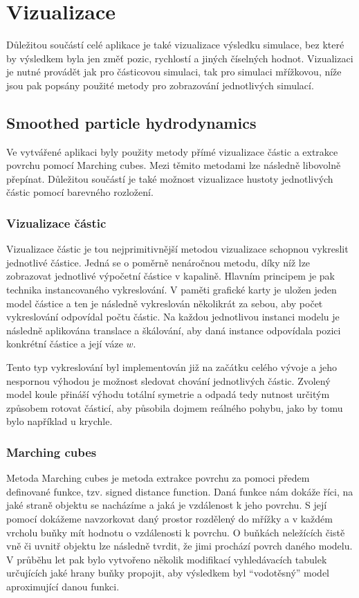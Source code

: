 \section{Vizualizace}
\label{chapter:Vizualizace}
Důležitou součástí celé aplikace je také vizualizace výsledku simulace, bez které by výsledkem byla jen změť pozic, rychlostí a jiných číselných hodnot. Vizualizaci je nutné provádět jak pro částicovou simulaci, tak pro simulaci mřížkovou, níže jsou pak popsány použité metody pro zobrazování jednotlivých simulací.

\subsection{Smoothed particle hydrodynamics}
\label{chapter:vizSPH}
Ve vytvářené aplikaci byly použity metody přímé vizualizace částic a extrakce povrchu pomocí Marching cubes. Mezi těmito metodami lze následně libovolně přepínat. Důležitou součástí je také možnost vizualizace hustoty jednotlivých částic pomocí barevného rozložení.

\subsubsection{Vizualizace částic}
Vizualizace částic je tou nejprimitivnější metodou vizualizace schopnou vykreslit jednotlivé částice. Jedná se o poměrně nenáročnou metodu, díky níž lze zobrazovat jednotlivé výpočetní částice v kapalině. Hlavním principem je pak technika instancovaného vykreslování. V paměti grafické karty je uložen jeden model částice a ten je následně vykreslován několikrát za sebou, aby počet vykreslování odpovídal počtu částic. Na každou jednotlivou instanci modelu je následně aplikována translace a škálování, aby daná instance odpovídala pozici konkrétní částice a její váze $w$.

Tento typ vykreslování byl implementován již na začátku celého vývoje a jeho nespornou výhodou je možnost sledovat chování jednotlivých částic. Zvolený model koule přináší výhodu totální symetrie a odpadá tedy nutnost určitým způsobem rotovat částicí, aby působila dojmem reálného pohybu, jako by tomu bylo například u krychle.

\subsubsection{Marching cubes}
Metoda Marching cubes \cite{marchingCubes} je metoda extrakce povrchu za pomoci předem definované funkce, tzv. signed distance function. Daná funkce nám dokáže říci, na jaké straně objektu se nacházíme a jaká je vzdálenost k jeho povrchu. S její pomocí dokážeme navzorkovat daný prostor rozdělený do mřížky a v každém vrcholu buňky mít hodnotu o vzdálenosti k povrchu. O buňkách neležících čistě vně či uvnitř objektu lze následně tvrdit, že jimi prochází povrch daného modelu. V průběhu let pak bylo vytvořeno několik modifikací vyhledávacích tabulek určujících jaké hrany buňky propojit, aby výsledkem byl \enquote{vodotěsný} model aproximující danou funkci.


